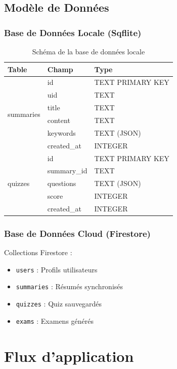 \documentclass[12pt,a4paper]{report}
\begin{document}
\subsection{Modèle de Données}

\subsubsection{Base de Données Locale (Sqflite)}

\begin{table}[H]
\centering
\begin{tabular}{|l|l|l|}
\hline
\textbf{Table} & \textbf{Champ} & \textbf{Type} \\
\hline
\multirow{6}{*}{summaries} & id & TEXT PRIMARY KEY \\
& uid & TEXT \\
& title & TEXT \\
& content & TEXT \\
& keywords & TEXT (JSON) \\
& created\_at & INTEGER \\
\hline
\multirow{5}{*}{quizzes} & id & TEXT PRIMARY KEY \\
& summary\_id & TEXT \\
& questions & TEXT (JSON) \\
& score & INTEGER \\
& created\_at & INTEGER \\
\hline
\end{tabular}
\caption{Schéma de la base de données locale}
\end{table}

\subsubsection{Base de Données Cloud (Firestore)}

Collections Firestore :
\begin{itemize}
    \item \texttt{users} : Profils utilisateurs
    \item \texttt{summaries} : Résumés synchronisés
    \item \texttt{quizzes} : Quiz sauvegardés
    \item \texttt{exams} : Examens générés
\end{itemize}

\section{Flux d'application}
\end{document}
